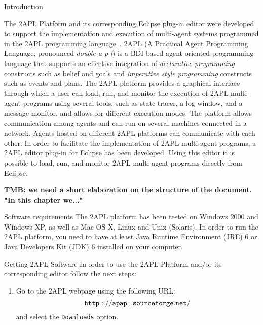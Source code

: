 \newcommand{\remarktmb}[1]{\textbf{RemarkTMB:}#1}

\begin{chapter}{Introduction}
\label{chap:introduction}

The 2APL Platform and its corresponding Eclipse plug-in editor were
developed to support the implementation and execution of multi-agent
systems programmed in the 2APL programming
language~\cite{Dastani:08a,D-RULECHP09,CLIMA09}. 2APL (A Practical
Agent Programming Language, pronounced \emph{double-a-p-l}) is a BDI-based
agent-oriented programming language that supports an effective
integration of \emph{declarative programming} constructs such as belief and
goals and \emph{imperative style programming} constructs such as events and
plans. The 2APL platform provides a graphical interface through
which a user can load, run, and monitor the execution of 2APL
multi-agent programs using several tools, such as state tracer, 
a log window, and a message monitor, and allows for different execution modes. 
The platform allows communication among agents and can run
on several machines connected in a network. Agents hosted on
different 2APL platforms can communicate with each other. In order
to facilitate the implementation of 2APL multi-agent programs, a
2APL editor plug-in for Eclipse has been developed. Using this editor it
is possible to load, run, and monitor 2APL multi-agent programs
directly from Eclipse.

\textbf{TMB: we need a short elaboration on the structure of the document. "In this chapter we..."}

\begin{section}{Software requirements}
The 2APL platform has been tested on Windows 2000 and Windows XP, as
well as Mac OS X, Linux and Unix (Solaris). In order to run the 2APL
platform, you need to have at least Java Runtime Environment (JRE) 6
or Java Developers Kit (JDK) 6 installed on your computer.
\end{section}

\begin{section}{Getting 2APL Software}
In order to use the 2APL Platform and/or its corresponding editor
follow the next steps:
\begin{enumerate}
    \item Go to the 2APL webpage using the following URL:
          $${\tt http://apapl.sourceforge.net/}$$
          and select the {\tt Downloads} option.


\end{enumerate}
\end{section}
\end{chapter}
